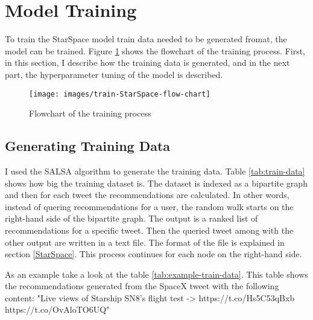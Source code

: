 \section{Model Training}
\label{Model Training}
To train the StarSpace model train data needed to be generated fromat, the model can be trained. Figure \ref{fig:star-space-training} shows the flowchart of the training process. First, in this section, I describe how the training data is generated, and in the next part, the hyperparameter tuning of the model is described.

\begin{figure}[!h]
	\centering
	\texttt{[image: images/train-StarSpace-flow-chart]}
	\caption{Flowchart of the training process}
	\label{fig:star-space-training}
\end{figure}

\subsection{Generating Training Data}
\label{Generating Training Data}
I used the SALSA algorithm to generate the training data. Table \ref{tab:train-data} shows how big the training dataset is. The dataset is indexed as a bipartite graph and then for each tweet the recommendations are calculated. In other words, instead of quering recommendations for a user, the random walk starts on the right-hand side of the bipartite graph. The output is a ranked list of recommendations for a specific tweet. Then the queried tweet among with the other output are written in a text file. The format of the file is explained in section \ref{StarSpace}. This process continues for each node on the right-hand side.



As an example take a look at the table \ref{tab:example-train-data}. This table shows the recommendations generated from the SpaceX tweet with the following content: "Live views of Starship SN8’s flight test -> https://t.co/Hs5C53qBxb https://t.co/OvAloTO6UQ"

